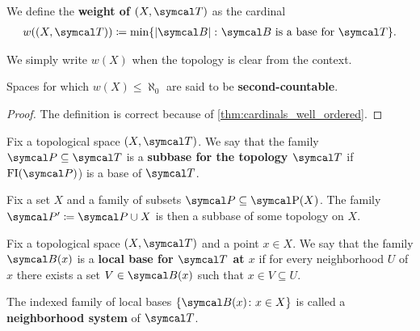 \begin{definition}\label{def:topological_space_weight}
  We define the \textbf{weight of \( (X, \Cal{T}) \)} as the cardinal
  \begin{align*}
    w((X, \Cal{T})) \coloneqq \min \{ \Abs{\Cal{B}} \colon \Cal{B} \text{ is a base for } \Cal{T} \}.
  \end{align*}

  We simply write \( w(X) \) when the topology is clear from the context.

  Spaces for which \( w(X) \leq \aleph_0 \) are said to be \textbf{second-countable}.
\end{definition}
\begin{proof}
  The definition is correct because of \cref{thm:cardinals_well_ordered}.
\end{proof}

\begin{definition}\label{def:topological_subbase}\cite[12]{Engelking1989}
  Fix a topological space \( (X, \Cal{T}) \). We say that the family \( \Cal{P} \subseteq \Cal{T} \) is a \textbf{subbase for the topology \( \Cal{T} \)} if \( \FI(\Cal{P}) \)) is a base of \( \Cal{T} \).
\end{definition}

\begin{proposition}
  Fix a set \( X \) and a family of subsets \( \Cal{P} \subseteq \Power(X) \). The family \( \Cal{P}' \coloneqq \Cal{P} \cup X \) is then a subbase of some topology on \( X \).
\end{proposition}

\begin{definition}\label{def:topological_local_base}\cite[12]{Engelking1989}
  Fix a topological space \( (X, \Cal{T}) \) and a point \( x \in X \). We say that the family \( \Cal{B}(x) \) is a \textbf{local base for \( \Cal{T} \) at \( x \)} if for every neighborhood \( U \) of \( x \) there exists a set \( V \in \Cal{B}(x) \) such that \( x \in V \subseteq U \).

  The indexed family of local bases \( \{ \Cal{B}(x) \colon x \in X \} \) is called a \textbf{neighborhood system} of \( \Cal{T} \).
\end{definition}

